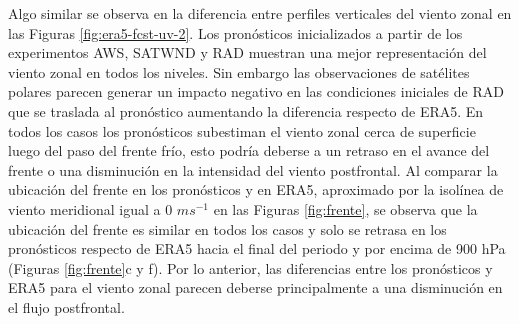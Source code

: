 \documentclass[12pt,oneside,a4paper]{reedthesis}
\begin{document}
Algo similar se observa en la diferencia entre perfiles verticales del viento zonal en las Figuras \ref{fig:era5-fcst-uv-2}. Los pronósticos inicializados a partir de los experimentos AWS, SATWND y RAD muestran una mejor representación del viento zonal en todos los niveles. Sin embargo las observaciones de satélites polares parecen generar un impacto negativo en las condiciones iniciales de RAD que se traslada al pronóstico aumentando la diferencia respecto de ERA5. En todos los casos los pronósticos subestiman el viento zonal cerca de superficie luego del paso del frente frío, esto podría deberse a un retraso en el avance del frente o una disminución en la intensidad del viento postfrontal. Al comparar la ubicación del frente en los pronósticos y en ERA5, aproximado por la isolínea de viento meridional igual a 0 \(ms^{-1}\) en las Figuras \ref{fig:frente}, se observa que la ubicación del frente es similar en todos los casos y solo se retrasa en los pronósticos respecto de ERA5 hacia el final del periodo y por encima de 900 hPa (Figuras \ref{fig:frente}c y f). Por lo anterior, las diferencias entre los pronósticos y ERA5 para el viento zonal parecen deberse principalmente a una disminución en el flujo postfrontal.
\end{document}
